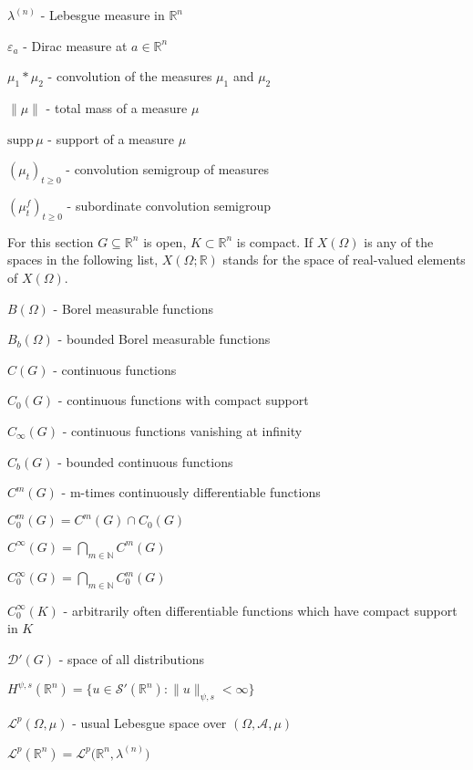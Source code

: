 \documentclass[a4paper, 12pt]{report}
\theoremstyle{remark}
\theoremstyle{definition}
\begin{document}
\noindent$\lambda^{(n)}$ - Lebesgue measure in $\mathbb{R}^n$

\noindent$\varepsilon_a$ - Dirac measure at $a \in \mathbb{R}^n$

\noindent$\mu_1 \ast \mu_2$ - convolution of the measures $\mu_1$ and $\mu_2$

\noindent$\|\mu\|$ - total mass of a measure $\mu$

\noindent$\text{supp}\,\mu$ - support of a measure $\mu$

\noindent$(\mu_t)_{t \ge 0}$ - convolution semigroup of measures

\noindent$(\mu_t^f)_{t \ge 0}$ - subordinate convolution semigroup

\bigbreak

\noindent For this section $G \subseteq \mathbb{R}^n$ is open, $K \subset \mathbb{R}^n$ is compact.  If $X(\Omega)$ is any of the spaces in the following list, $X(\Omega; \mathbb{R})$ stands for the space of real-valued elements of $X(\Omega)$.

\noindent$B(\Omega)$ - Borel measurable functions

\noindent$B_b(\Omega)$ - bounded Borel measurable functions

\noindent$C(G)$ - continuous functions

\noindent$C_0(G)$ - continuous functions with compact support

\noindent$C_\infty(G)$ - continuous functions vanishing at infinity

\noindent$C_b(G)$ - bounded continuous functions

\noindent$C^m(G)$ - m-times continuously differentiable functions

\noindent$C_0^m(G) = C^m(G) \cap C_0(G)$

\noindent$C^\infty(G) = \bigcap_{m \in \mathbb{N}}C^m(G)$

\noindent$C_0^\infty(G) = \bigcap_{m \in \mathbb{N}}C_0^m(G)$

\noindent$C_0^\infty(K)$ - arbitrarily often differentiable functions which have compact support in $K$

\noindent$\mathcal{D}'(G)$ - space of all distributions

\noindent$H^{\psi, s}(\mathbb{R}^n) = \{u \in \mathcal{S}'(\mathbb{R}^n) : \|u\|_{\psi, s} < \infty\}$

\noindent$\mathcal{L}^p(\Omega, \mu)$ - usual Lebesgue space over $(\Omega, \mathcal{A}, \mu)$

\noindent$\mathcal{L}^p(\mathbb{R}^n) = \mathcal{L}^p\big(\mathbb{R}^n, \lambda^{(n)}\big)$
\end{document}
